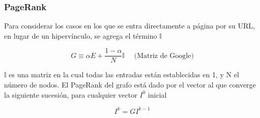 \documentclass[xetex,mathserif,serif, 8pt]{beamer}
\begin{document}
\begin{frame}
    \frametitle{PageRank}

    Para considerar los casos en los que se entra directamente a página por su URL, en lugar de un hipervínculo, se agrega el término $\mathds{I}$

    \begin{equation}
        G \equiv \alpha E + \frac{1-\alpha}{N} \mathds{I} \quad \text{ (Matriz de Google)}
    \end{equation}

    $\mathds{I}$ es una matriz en la cual todas las entradas están establecidas en 1, y N el número de nodos. El PageRank del grafo está dado por el vector al que converge la siguiente sucesión, para cualquier vector $I^0$ inicial

    \begin{equation}
        I^k = G I^{k-1}
    \end{equation}

    \begin{figure}[H]
    \begin{center}
\end{center}\end{figure}\end{frame}
\end{document}
